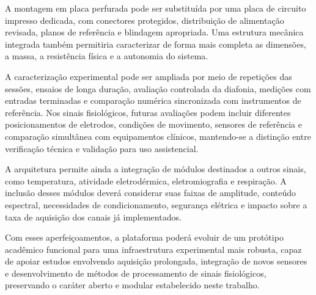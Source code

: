 \documentclass[a4paper,12pt]{fcte}
\begin{document}
A montagem em placa perfurada pode ser substituída por uma placa de circuito impresso dedicada, com conectores protegidos, distribuição de alimentação revisada, planos de referência e blindagem apropriada. Uma estrutura mecânica integrada também permitiria caracterizar de forma mais completa as dimensões, a massa, a resistência física e a autonomia do sistema.

A caracterização experimental pode ser ampliada por meio de repetições das sessões, ensaios de longa duração, avaliação controlada da diafonia, medições com entradas terminadas e comparação numérica sincronizada com instrumentos de referência. Nos sinais fisiológicos, futuras avaliações podem incluir diferentes posicionamentos de eletrodos, condições de movimento, sensores de referência e comparação simultânea com equipamentos clínicos, mantendo-se a distinção entre verificação técnica e validação para uso assistencial.

A arquitetura permite ainda a integração de módulos destinados a outros sinais, como temperatura, atividade eletrodérmica, eletromiografia e respiração. A inclusão desses módulos deverá considerar suas faixas de amplitude, conteúdo espectral, necessidades de condicionamento, segurança elétrica e impacto sobre a taxa de aquisição dos canais já implementados.

Com esses aperfeiçoamentos, a plataforma poderá evoluir de um protótipo acadêmico funcional para uma infraestrutura experimental mais robusta, capaz de apoiar estudos envolvendo aquisição prolongada, integração de novos sensores e desenvolvimento de métodos de processamento de sinais fisiológicos, preservando o caráter aberto e modular estabelecido neste trabalho.


\end{document}
